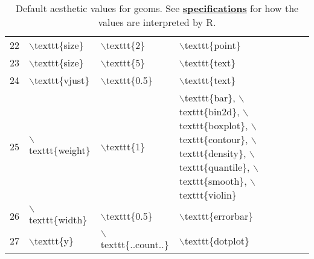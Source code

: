 \begin{table}[ht]
\begin{tabular}{rlll}
  22 & $\backslash$texttt\{size\} & $\backslash$texttt\{2\} & $\backslash$texttt\{point\} \\ 
  23 & $\backslash$texttt\{size\} & $\backslash$texttt\{5\} & $\backslash$texttt\{text\} \\ 
  24 & $\backslash$texttt\{vjust\} & $\backslash$texttt\{0.5\} & $\backslash$texttt\{text\} \\ 
  25 & $\backslash$texttt\{weight\} & $\backslash$texttt\{1\} & $\backslash$texttt\{bar\}, $\backslash$texttt\{bin2d\}, $\backslash$texttt\{boxplot\}, $\backslash$texttt\{contour\}, $\backslash$texttt\{density\}, $\backslash$texttt\{quantile\}, $\backslash$texttt\{smooth\}, $\backslash$texttt\{violin\} \\ 
  26 & $\backslash$texttt\{width\} & $\backslash$texttt\{0.5\} & $\backslash$texttt\{errorbar\} \\ 
  27 & $\backslash$texttt\{y\} & $\backslash$texttt\{..count..\} & $\backslash$texttt\{dotplot\} \\ 
   \hline
\end{tabular}
\caption{Default aesthetic values for geoms. See \hyperref[cha:specifications]{\textbf{specifications}} for how the values are interpreted by R.} 
\label{tbl:geom-defaults}
\end{table}
